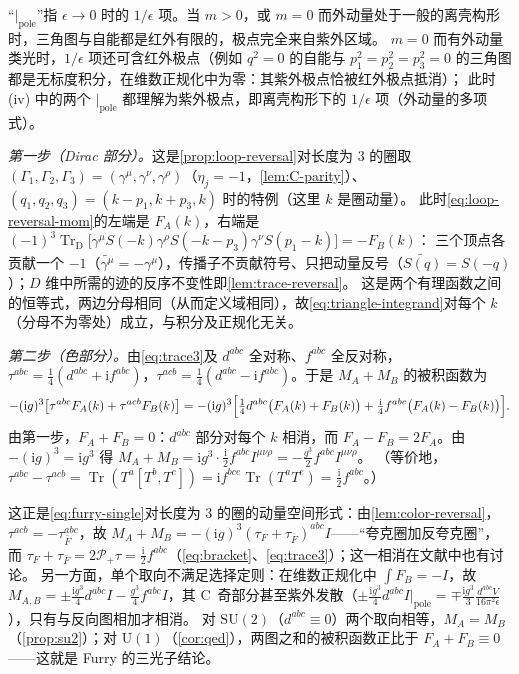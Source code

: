 \documentclass[UTF8,a4paper,11pt,fontset=fandol]{ctexart}
\makeatletter
\theoremstyle{cplain}
\theoremstyle{cdefinition}
\theoremstyle{cremark}
\renewcommand{\proofname}{证明}
\renewenvironment{proof}[1][\proofname]{\par\pushQED{\qed}\normalfont\topsep6\p@\@plus6\p@\relax
  \trivlist\item[\hskip\labelsep\itshape #1\hspace{0.5em}]\ignorespaces}{\popQED\endtrivlist\@endpefalse}
\numberwithin{equation}{section}
\DeclareMathOperator{\Tr}{Tr}
\newcommand{\TrD}{\operatorname{Tr}_{\mathrm{D}}}   %
\newcommand{\Pp}{\mathcal{P}_{+}}                    %
\newcommand{\ii}{\mathrm{i}}                        %
\newcommand{\Cconj}[1]{\widetilde{#1}}              %
\makeatother
\begin{document}
“$|_{\mathrm{pole}}$”指 $\epsilon\to0$ 时的 $1/\epsilon$ 项。当 $m>0$，或 $m=0$ 而外动量处于一般的离壳构形时，三角图与自能都是红外有限的，极点完全来自紫外区域。
$m=0$ 而有外动量类光时，$1/\epsilon$ 项还可含红外极点（例如 $q^2=0$ 的自能与 $p_1^2=p_2^2=p_3^2=0$ 的三角图都是无标度积分，在维数正规化中为零：其紫外极点恰被红外极点抵消）；
此时 (iv) 中的两个 $|_{\mathrm{pole}}$ 都理解为紫外极点，即离壳构形下的 $1/\epsilon$ 项（外动量的多项式）。

\begin{proof}[{\cref{prop:triangle}(i) 的证明}]
\emph{第一步（Dirac 部分）。}这是\cref{prop:loop-reversal}对长度为 $3$ 的圈取 $(\Gamma_1,\Gamma_2,\Gamma_3)=(\gamma^\mu,\gamma^\nu,\gamma^\rho)$（$\eta_j=-1$，\cref{lem:C-parity}）、$(q_1,q_2,q_3)=(k-p_1,k+p_3,k)$ 时的特例（这里 $k$ 是圈动量）。
此时\cref{eq:loop-reversal-mom}的左端是 $F_A(k)$，右端是 $(-1)^3\TrD\bigl[\gamma^\mu S(-k)\gamma^\rho S(-k-p_3)\gamma^\nu S(p_1-k)\bigr]=-F_B(k)$：
三个顶点各贡献一个 $-1$（$\Cconj{\gamma^\mu}=-\gamma^\mu$），传播子不贡献符号、只把动量反号（$\Cconj{S(q)}=S(-q)$）；$D$ 维中所需的迹的反序不变性即\cref{lem:trace-reversal}。
这是两个有理函数之间的恒等式，两边分母相同（从而定义域相同），故\cref{eq:triangle-integrand}对每个 $k$（分母不为零处）成立，与积分及正规化无关。

\emph{第二步（色部分）。}由\cref{eq:trace3}及 $d^{abc}$ 全对称、$f^{abc}$ 全反对称，$\tau^{abc}=\frac14(d^{abc}+\ii f^{abc})$，$\tau^{acb}=\frac14(d^{abc}-\ii f^{abc})$。于是 $M_A+M_B$ 的被积函数为
\begin{equation}\label{eq:tri-colour}
-(\ii g)^3\bigl[\tau^{abc}F_A(k)+\tau^{acb}F_B(k)\bigr]
=-(\ii g)^3\Bigl[\tfrac14d^{abc}\bigl(F_A(k)+F_B(k)\bigr)+\tfrac{\ii}{4}f^{abc}\bigl(F_A(k)-F_B(k)\bigr)\Bigr].
\end{equation}
由第一步，$F_A+F_B=0$：$d^{abc}$ 部分对每个 $k$ 相消，而 $F_A-F_B=2F_A$。由 $-(\ii g)^3=\ii g^3$ 得
$M_A+M_B=\ii g^3\cdot\frac{\ii}{2}f^{abc}I^{\mu\nu\rho}=-\frac{g^3}{2}f^{abc}I^{\mu\nu\rho}$。
（等价地，$\tau^{abc}-\tau^{acb}=\Tr(T^a[T^b,T^c])=\ii f^{bce}\Tr(T^aT^e)=\frac{\ii}{2}f^{abc}$。）
\end{proof}

这正是\cref{eq:furry-single}对长度为 $3$ 的圈的动量空间形式：由\cref{lem:color-reversal}，$\tau^{acb}=-\tau_{\bar F}^{abc}$，故 $M_A+M_B=-(\ii g)^3(\tau_F+\tau_{\bar F})^{abc}I$——“夸克圈加反夸克圈”，
而 $\tau_F+\tau_{\bar F}=2\Pp\tau=\frac{\ii}{2}f^{abc}$（\cref{eq:bracket}、\cref{eq:trace3}）；这一相消在文献中也有讨论\cite{BlumAlkoferHuberWindisch2015}。
另一方面，单个取向不满足选择定则：在维数正规化中 $\int F_B=-I$，故
$M_{A,B}=\pm\frac{\ii g^3}{4}d^{abc}I-\frac{g^3}{4}f^{abc}I$，其 C~奇部分甚至紫外发散（$\pm\frac{\ii g^3}{4}d^{abc}I|_{\mathrm{pole}}=\mp\frac{\ii g^3}{3}\frac{d^{abc}V}{16\pi^2\epsilon}$），只有与反向图相加才相消。
对 $\mathrm{SU}(2)$（$d^{abc}\equiv0$）两个取向相等，$M_A=M_B$（\cref{prop:su2}）；对 $\mathrm U(1)$（\cref{cor:qed}），两图之和的被积函数正比于 $F_A+F_B\equiv0$——这就是 Furry 的三光子结论\cite{Furry1937}。
\end{document}
